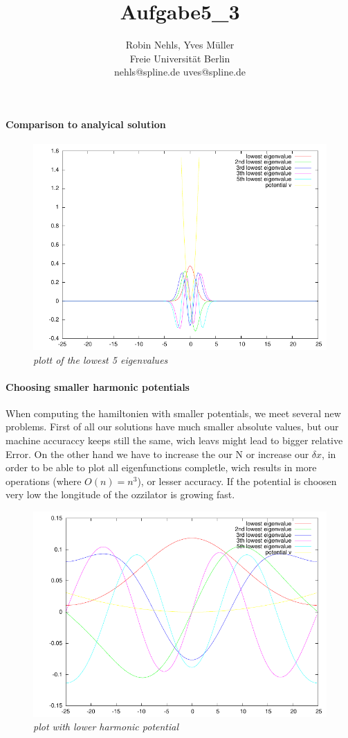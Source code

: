 \documentclass[11pt,a4paper,notitlepage,onecolumn]{article}
\title{Aufgabe5\_3}
\author{Robin Nehls, Yves Müller\\
  Freie Universit\"at Berlin\\
  nehls@spline.de uves@spline.de }
\date{}
\begin{document}
\maketitle

\paragraph{Comparison to analyical solution}

\begin{figure}
\centering
\includegraphics[width=\textwidth]{aufgabe3-normal.pdf}
\caption{\em \small plott of the lowest 5 eigenvalues}
\end{figure}

\paragraph{Choosing smaller harmonic potentials}
When computing the hamiltonien with smaller potentials, we meet several new 
problems. First of all our solutions have much smaller absolute values, but
our machine accuraccy keeps still the same, wich leavs might lead to bigger
relative Error. On the other hand we have to increase the our N or increase 
our $\delta x$, in order to be able to plot all eigenfunctions completle,
wich results in more operations (where $O(n)=n^3$), or lesser accuracy. If 
the potential is choosen very low the longitude of the ozzilator is growing
fast.


\begin{figure}
\centering
\includegraphics[width=\textwidth]{aufgabe3-lowpot.pdf}
\caption{\em \small plot with lower harmonic potential}
\end{figure}
\end{document}
